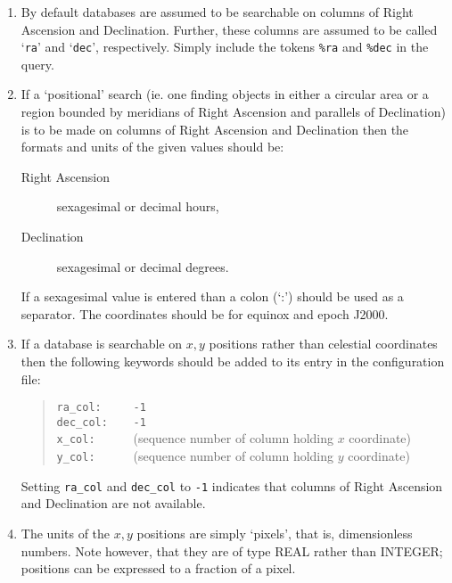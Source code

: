 \documentclass[twoside,11pt,nolof,chapters]{starlink}
\begin{document}
\begin{enumerate}

  \item By default databases are assumed to be searchable on columns
   of Right Ascension and Declination.  Further, these columns are
   assumed to be called `\texttt{ra}' and `\texttt{dec}', respectively.
   Simply include the tokens \texttt{\%ra} and \texttt{\%dec} in the query.

  \item If a `positional' search (ie. one finding objects in either a
   circular area or a region bounded by meridians of Right Ascension and
   parallels of Declination) is to be made on columns of Right Ascension
   and Declination then the formats and units of the given values should
   be:

  \begin{description}

    \item[Right Ascension] sexagesimal or decimal hours,

    \item[Declination] sexagesimal or decimal degrees.

  \end{description}

   If a sexagesimal value is entered than a colon (`:') should be used
   as a separator.  The coordinates should be for equinox and epoch J2000.

  \item If a database is searchable on $x,y$\/ positions rather than
   celestial coordinates then the following keywords should be added to
   its entry in the configuration file:

  \begin{quote}
    \verb+ra_col:     -1+  \\
    \verb+dec_col:    -1+  \\
    \verb+x_col:      +(sequence number of column holding $x$\/ coordinate) \\
    \verb+y_col:      +(sequence number of column holding $y$\/ coordinate)
  \end{quote}

   Setting \texttt{ra\_col} and \texttt{dec\_col} to \texttt{-1} indicates that
   columns of Right Ascension and Declination are not available.

  \item The units of the $x,y$\/ positions are simply `pixels', that is,
   dimensionless numbers.  Note however, that they are of type REAL rather
   than INTEGER; positions can be expressed to a fraction of a pixel.


\end{enumerate}
\end{document}
